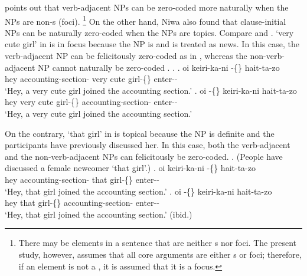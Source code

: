 points out that verb-adjacent NPs
can be zero-coded more naturally when the NPs are non-s (foci).%
 \footnote{
 There may be elements in a sentence that are
 neither s nor foci.
 The present study, however, assumes that all core arguments are
 either s or foci;
 therefore, if an element is not a ,
 it is assumed that it is a focus.
 }
On the other hand,
Niwa also found that clause-initial NPs can be naturally zero-coded
when the NPs are topics.
Compare \Next and \NNext.
 `very cute girl' in \Next is in focus
because the NP is  and is treated as news.
In this case,
the verb-adjacent NP can be felicitously zero-coded as in \Next[a],
whereas the non-verb-adjacent NP cannot naturally be zero-coded \Next[b].
%
\ex.
 \ag. oi keiri-ka-ni   -\{\} hait-ta-zo \\
      hey accounting-section- very cute girl-\{\} enter--\\
      `Hey, a very cute girl joined the accounting section.'
 \bg. oi   -\{\} keiri-ka-ni hait-ta-zo \\
      hey very cute girl-\{\} accounting-section- enter--\\
      `Hey, a very cute girl joined the accounting section.'
      \hfill{\cite[293]{niwa06}}

On the contrary,
 `that girl' in \Next is topical
because the NP is definite and the participants have previously discussed her.
In this case,
both the verb-adjacent and the non-verb-adjacent NPs can felicitously be zero-coded.
%
\ex. (People have discussed a female newcomer  `that girl'.)
 \ag. oi keiri-ka-ni  -\{\} hait-ta-zo \\
      hey accounting-section- that girl-\{\} enter--\\
      `Hey, that girl joined the accounting section.'
 \bg. oi  -\{\} keiri-ka-ni hait-ta-zo \\
      hey that girl-\{\} accounting-section- enter--\\
      `Hey, that girl joined the accounting section.'
      \hfill{(ibid.)}

